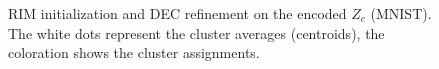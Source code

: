 			\begin{figure}[!ht]
				\centering
				\caption[RIM initialization and DEC refinement]{RIM initialization and DEC refinement on the encoded $Z_c$ (MNIST). The white dots represent the cluster averages (centroids), the coloration shows the cluster assignments.}
				\label{fig:clust_mnist}
			\end{figure}
			
